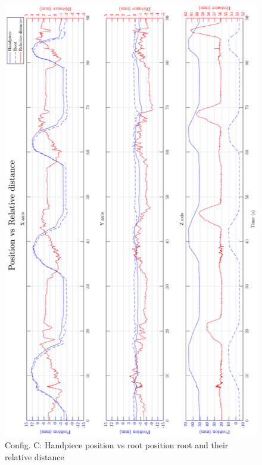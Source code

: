 \begin{figure}[htbp]
\begin{center}
\includegraphics[width=0.9\linewidth]{Images/exp/exp1_3_1.png}
\caption{Config. C: Handpiece position vs root position root and their relative distance}
\label{fig: exp1_3_1}
\end{center}
\end{figure}		

